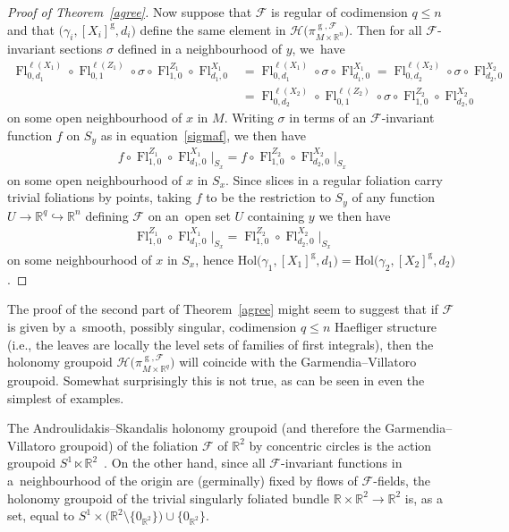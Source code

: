 \documentclass[pdftex]{sigma}
\numberwithin{equation}{section}
\def\g{\operatorname{g}}
\def\Fl{\operatorname{Fl}}
\def\FF{{\mathcal{F}}}
\def\HH{{\mathcal{H}}}
\def\RB{{\mathbb{R}}}
\begin{document}
\begin{proof}[Proof of Theorem~\ref{agree}]
Now suppose that $\FF$ is regular of codimension $q\leq n$ and that $\big(\gamma_{i},[X_{i}]^{\g},d_{i}\big)$ define the same element in $\HH\big(\pi_{M\times\RB^{n}}^{\g,\FF}\big)$. Then for all $\FF$-invariant sections $\sigma$ defined in a neighbourhood of $y$, we~have
\begin{align*}
\Fl^{\ell(X_{1})}_{0,d_{1}}\circ\Fl^{\ell(Z_{1})}_{0,1}\circ\sigma\circ\Fl^{Z_{1}}_{1,0} \circ\Fl^{X_{1}}_{d_{1},0} &= \Fl^{\ell(X_{1})}_{0,d_{1}}\circ\sigma\circ\Fl^{X_{1}}_{d_{1},0} = \Fl^{\ell(X_{2})}_{0,d_{2}}\circ\sigma\circ\Fl^{X_{2}}_{d_{2},0}
\\
&= \Fl^{\ell(X_{2})}_{0,d_{2}}\circ\Fl^{\ell(Z_{2})}_{0,1}\circ\sigma\circ \Fl^{Z_{2}}_{1,0}\circ\Fl^{X_{2}}_{d_{2},0}
\end{align*}
on some open neighbourhood of $x$ in $M$. Writing $\sigma$ in terms of an $\FF$-invariant function $f$ on $S_{y}$ as in equation~\eqref{sigmaf}, we then have
\begin{gather*}
f\circ\Fl^{Z_{1}}_{1,0}\circ\Fl^{X_{1}}_{d_{1},0}\big|_{S_{x}} = f\circ \Fl^{Z_{2}}_{1,0}\circ\Fl^{X_{2}}_{d_{2},0}\big|_{S_{x}}
\end{gather*}
on some open neighbourhood of $x$ in $S_{x}$. Since slices in a regular foliation carry trivial foliations by points, taking $f$ to be the restriction to $S_{y}$ of any function $U\rightarrow\RB^{q}\hookrightarrow\RB^{n}$ defining $\FF$ on an~open set $U$ containing $y$ we then have
\begin{gather*}
\Fl^{Z_{1}}_{1,0}\circ\Fl^{X_{1}}_{d_{1},0}\big|_{S_{x}} = \Fl^{Z_{2}}_{1,0}\circ\Fl^{X_{2}}_{d_{2},0}\big|_{S_{x}}
\end{gather*}
on some neighbourhood of $x$ in $S_{x}$, hence $\text{Hol}\big(\gamma_{1},[X_{1}]^{\g},d_{1}\big) = \text{Hol}\big(\gamma_{2},[X_{2}]^{\g},d_{2}\big)$.
\end{proof}

The proof of the second part of Theorem~\ref{agree} might seem to suggest that if $\FF$ is given by a~smooth, possibly singular, codimension $q\leq n$ Haefliger structure~\cite{ha3} (i.e., the leaves are locally the level sets of families of first integrals), then the holonomy groupoid $\HH\big(\pi_{M\times\RB^{q}}^{\g,\FF}\big)$ will coincide with the Garmendia--Villatoro groupoid. Somewhat surprisingly this is not true, as can be seen in even the simplest of examples.

\begin{Example}\label{counter1}
The Androulidakis--Skandalis holonomy groupoid (and therefore the Garmen\-dia--Villatoro groupoid) of the foliation $\FF$ of $\RB^{2}$ by concentric circles is the action groupoid $S^{1}\ltimes\RB^{2}$~\cite[Example 2, p.~496]{debord}. On the other hand, since all $\FF$-invariant functions in a~neigh\-bour\-hood of the origin are (germinally) fixed by flows of $\FF$-fields, the holonomy groupoid of the trivial singularly foliated bundle $\RB\times\RB^{2}\rightarrow\RB^{2}$ is, as a set, equal to $S^{1}\times\big(\RB^{2}\setminus\{0_{\RB^{2}}\}\big)\cup\{0_{\RB^{2}}\}$.
\end{Example}
\end{document}
